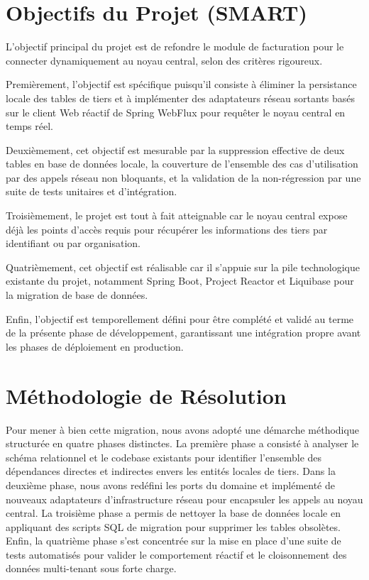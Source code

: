 \section*{Objectifs du Projet (SMART)}
L'objectif principal du projet est de refondre le module de facturation pour le connecter dynamiquement au noyau central, selon des critères rigoureux.

Premièrement, l'objectif est spécifique puisqu'il consiste à éliminer la persistance locale des tables de tiers et à implémenter des adaptateurs réseau sortants basés sur le client Web réactif de Spring WebFlux pour requêter le noyau central en temps réel.

Deuxièmement, cet objectif est mesurable par la suppression effective de deux tables en base de données locale, la couverture de l'ensemble des cas d'utilisation par des appels réseau non bloquants, et la validation de la non-régression par une suite de tests unitaires et d'intégration.

Troisièmement, le projet est tout à fait atteignable car le noyau central expose déjà les points d'accès requis pour récupérer les informations des tiers par identifiant ou par organisation.

Quatrièmement, cet objectif est réalisable car il s'appuie sur la pile technologique existante du projet, notamment Spring Boot, Project Reactor et Liquibase pour la migration de base de données.

Enfin, l'objectif est temporellement défini pour être complété et validé au terme de la présente phase de développement, garantissant une intégration propre avant les phases de déploiement en production.

\section{Méthodologie de Résolution}
Pour mener à bien cette migration, nous avons adopté une démarche méthodique structurée en quatre phases distinctes. La première phase a consisté à analyser le schéma relationnel et le codebase existants pour identifier l'ensemble des dépendances directes et indirectes envers les entités locales de tiers. Dans la deuxième phase, nous avons redéfini les ports du domaine et implémenté de nouveaux adaptateurs d'infrastructure réseau pour encapsuler les appels au noyau central. La troisième phase a permis de nettoyer la base de données locale en appliquant des scripts SQL de migration pour supprimer les tables obsolètes. Enfin, la quatrième phase s'est concentrée sur la mise en place d'une suite de tests automatisés pour valider le comportement réactif et le cloisonnement des données multi-tenant sous forte charge.

